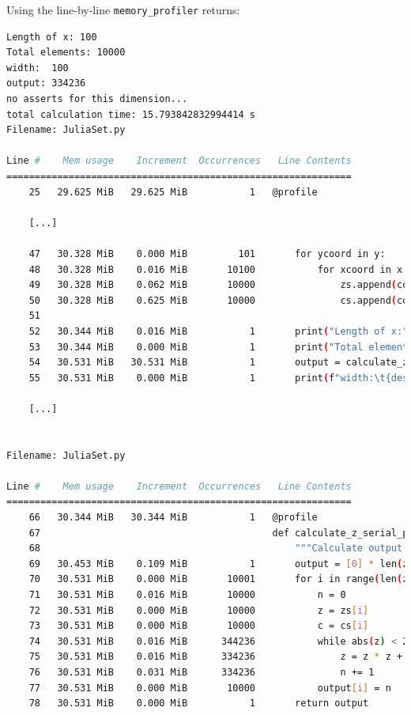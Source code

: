 \documentclass[a4paper,12pt]{article}
\begin{document}
Using the line-by-line \verb|memory_profiler| returns:
\begin{lstlisting}[language=bash,basicstyle=\tiny\ttfamily]
Length of x: 100
Total elements: 10000
width:	100
output:	334236
no asserts for this dimension...
total calculation time: 15.793842832994414 s
Filename: JuliaSet.py

Line #    Mem usage    Increment  Occurrences   Line Contents
=============================================================
    25   29.625 MiB   29.625 MiB           1   @profile

    [...]

    47   30.328 MiB    0.000 MiB         101       for ycoord in y:
    48   30.328 MiB    0.016 MiB       10100           for xcoord in x:
    49   30.328 MiB    0.062 MiB       10000               zs.append(complex(xcoord, ycoord))
    50   30.328 MiB    0.625 MiB       10000               cs.append(complex(c_real, c_imag))
    51
    52   30.344 MiB    0.016 MiB           1       print("Length of x:", len(x))
    53   30.344 MiB    0.000 MiB           1       print("Total elements:", len(zs))
    54   30.531 MiB   30.531 MiB           1       output = calculate_z_serial_purepython(max_iterations, zs, cs)
    55   30.531 MiB    0.000 MiB           1       print(f"width:\t{desired_width}\noutput:\t{sum(output)}")

    [...]


Filename: JuliaSet.py

Line #    Mem usage    Increment  Occurrences   Line Contents
=============================================================
    66   30.344 MiB   30.344 MiB           1   @profile
    67                                         def calculate_z_serial_purepython(maxiter, zs, cs):
    68                                             """Calculate output list using Julia update rule"""
    69   30.453 MiB    0.109 MiB           1       output = [0] * len(zs)
    70   30.531 MiB    0.000 MiB       10001       for i in range(len(zs)):
    71   30.531 MiB    0.016 MiB       10000           n = 0
    72   30.531 MiB    0.000 MiB       10000           z = zs[i]
    73   30.531 MiB    0.000 MiB       10000           c = cs[i]
    74   30.531 MiB    0.016 MiB      344236           while abs(z) < 2 and n < maxiter:
    75   30.531 MiB    0.016 MiB      334236               z = z * z + c
    76   30.531 MiB    0.031 MiB      334236               n += 1
    77   30.531 MiB    0.000 MiB       10000           output[i] = n
    78   30.531 MiB    0.000 MiB           1       return output
\end{lstlisting}
\end{document}
